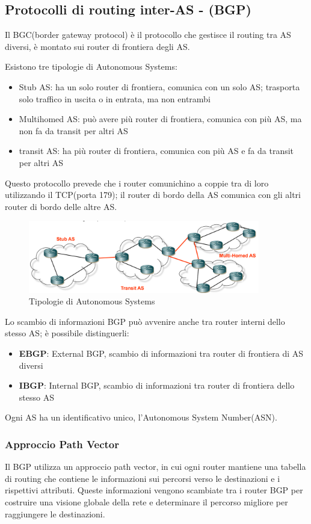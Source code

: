 \subsection{Protocolli di routing inter-AS - (BGP)}
Il BGC(border gateway protocol) è il protocollo che gestisce il routing tra AS diversi, è montato sui router di frontiera degli AS.

Esistono tre tipologie di Autonomous Systems:  
\begin{itemize}
    \item Stub AS: ha un solo router di frontiera, comunica con un solo AS; trasporta solo traffico in uscita o in entrata, ma non entrambi
    \item Multihomed AS: può avere più router di frontiera, comunica con più AS, ma non fa da transit per altri AS
    \item transit AS: ha più router di frontiera, comunica con più AS e fa da transit per altri AS
\end{itemize}
Questo protocollo prevede che i router comunichino a coppie tra di loro utilizzando il TCP(porta 179); il router di bordo della AS comunica con gli altri router di bordo delle altre AS.

\begin{figure}[h!]
    \centering
    \includegraphics[width=0.9\textwidth]{images/tipologieAS.png}
    \caption{Tipologie di Autonomous Systems}
    \label{fig:tipologieAS}
\end{figure}

Lo scambio di informazioni BGP può avvenire anche tra router interni dello stesso AS; è possibile distinguerli:
\begin{itemize}
    \item \textbf{EBGP}: External BGP, scambio di informazioni tra router di frontiera di AS diversi
    \item \textbf{IBGP}: Internal BGP, scambio di informazioni tra router di frontiera dello stesso AS
\end{itemize}
Ogni AS ha un identificativo unico, l'Autonomous System Number(ASN).
\subsubsection{Approccio Path Vector}
Il BGP utilizza un approccio path vector, in cui ogni router mantiene una tabella di routing che contiene le informazioni sui percorsi verso le destinazioni e i rispettivi attributi.
Queste informazioni vengono scambiate tra i router BGP per costruire una visione globale della rete e determinare il percorso migliore per raggiungere le destinazioni.
